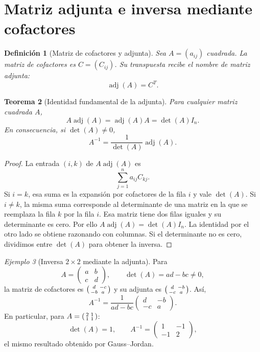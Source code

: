 \documentclass[12pt]{article}
\newtheorem{definicion}{Definición}[section]
\newtheorem{teorema}[definicion]{Teorema}
\theoremstyle{remark}
\newtheorem{ejemplo}[definicion]{Ejemplo}
\newcommand{\adj}{\operatorname{adj}}
\begin{document}
\section{Matriz adjunta e inversa mediante cofactores}
\begin{definicion}[Matriz de cofactores y adjunta]
Sea $A=(a_{ij})$ cuadrada. La \emph{matriz de cofactores} es $C=(C_{ij})$. Su transpuesta recibe el nombre de \emph{matriz adjunta}:
\[
\boxed{\adj(A)=C^T.}
\]
\end{definicion}

\begin{teorema}[Identidad fundamental de la adjunta]
Para cualquier matriz cuadrada $A$,
\[
A\adj(A)=\adj(A)A=\det(A)I_n.
\]
En consecuencia, si $\det(A)\ne0$,
\[
\boxed{A^{-1}=\frac{1}{\det(A)}\adj(A).}
\]
\end{teorema}
\begin{proof}
La entrada $(i,k)$ de $A\adj(A)$ es
\[
\sum_{j=1}^{n}a_{ij}C_{kj}.
\]
Si $i=k$, esa suma es la expansión por cofactores de la fila $i$ y vale $\det(A)$. Si $i\ne k$, la misma suma corresponde al determinante de una matriz en la que se reemplaza la fila $k$ por la fila $i$. Esa matriz tiene dos filas iguales y su determinante es cero. Por ello $A\adj(A)=\det(A)I_n$. La identidad por el otro lado se obtiene razonando con columnas. Si el determinante no es cero, dividimos entre $\det(A)$ para obtener la inversa.
\end{proof}

\begin{ejemplo}[Inversa $2\times2$ mediante la adjunta]
Para
\[
A=\begin{pmatrix}a&b\\c&d\end{pmatrix},\qquad \det(A)=ad-bc\ne0,
\]
la matriz de cofactores es $\begin{psmallmatrix}d&-c\\-b&a\end{psmallmatrix}$ y su adjunta es $\begin{psmallmatrix}d&-b\\-c&a\end{psmallmatrix}$. Así,
\[
\boxed{A^{-1}=\frac{1}{ad-bc}\begin{pmatrix}d&-b\\-c&a\end{pmatrix}.}
\]
En particular, para $A=\begin{psmallmatrix}2&1\\1&1\end{psmallmatrix}$:
\[
\det(A)=1,\qquad A^{-1}=\begin{pmatrix}1&-1\\-1&2\end{pmatrix},
\]
el mismo resultado obtenido por Gauss--Jordan.
\end{ejemplo}
\end{document}
